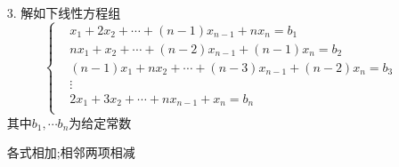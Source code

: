 \begin{itemize}
    \item[3.] 解如下线性方程组
    \begin{equation}
    \nonumber
        \left\{
        \begin{aligned}
            &x_1 +2x_2 +\cdots +(n-1)x_{n-1} +nx_{n} =b_1\\
            &nx_1 +x_2 +\cdots +(n-2)x_{n-1} +(n-1)x_{n} =b_2\\
            &(n-1)x_1 +nx_2 +\cdots +(n-3)x_{n-1} +(n-2)x_{n} =b_3\\
            &\vdots\\
            &2x_1 +3x_2 +\cdots +nx_{n-1} +x_{n} =b_n\\
        \end{aligned}
        \right.
    \end{equation} 
    其中$b_1,\cdots b_n$为给定常数
	\begin{solution}
	各式相加;相邻两项相减
	\end{solution}
    \vspace{2cm}
\end{itemize}

